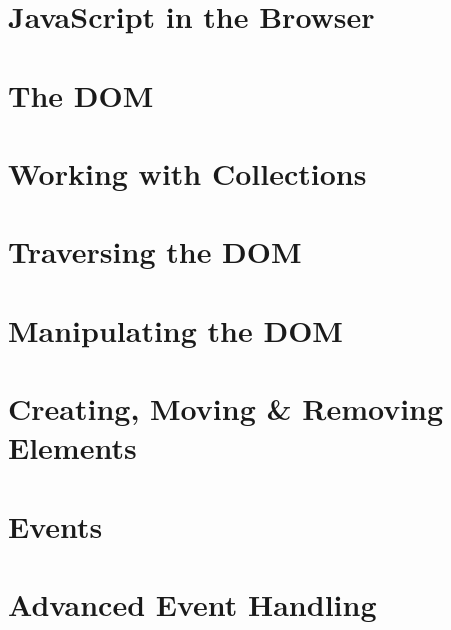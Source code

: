 \documentclass[b5paper,openany]{book}
\begin{document}
\tp


\tableofcontents



\chapter{JavaScript in the Browser}


\chapter{The DOM}


\chapter{Working with Collections}


\chapter{Traversing the DOM}


\chapter{Manipulating the DOM}


\chapter{Creating, Moving \& Removing Elements}


\chapter{Events}


\chapter{Advanced Event Handling}






\end{document}
